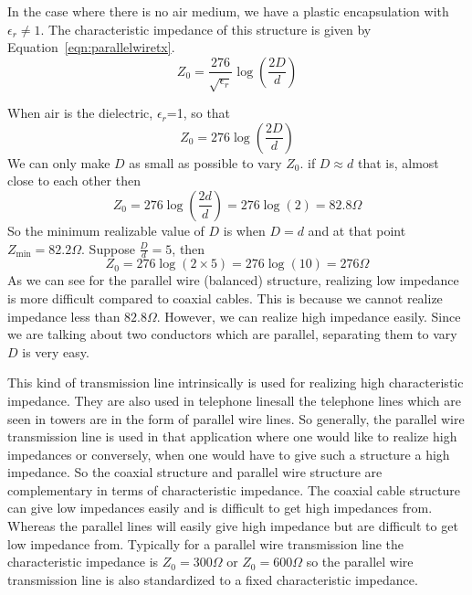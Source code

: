 In the case where there is no air medium, we have a plastic encapsulation with $\epsilon_r\neq1$. The characteristic impedance of this structure is given by Equation~\eqref{eqn:parallelwiretx}.
\begin{equation}
Z_0 =\dfrac{276}{\sqrt{\epsilon_r}}\log(\dfrac{2D}{d})
\label{eqn:parallelwiretx}
\end{equation}

When air is the dielectric, $\epsilon_r$=1, so that
\begin{equation}
Z_0 = 276\log(\dfrac{2D}{d})
\label{eqn:parallelwiretxair}
\end{equation}
We can only make $D$ as small as possible to vary $Z_0 $. if $D\approx d$ that is, almost close to each other then 
\begin{dmath*}
Z_0 = 276\log(\dfrac{2d}{d})
=276\log(2)
=82.8\varOmega
\end{dmath*}
So the minimum realizable value of $D$ is when $D = d$ and at that point $Z_\min=82.2\varOmega$. Suppose $\frac{D}{d}=5$, then
\begin{dmath*}
Z_0 =276\log(2\times5)
=276\log(10)
=276\varOmega
\end{dmath*}
As we can see for the parallel wire (balanced) structure, realizing low impedance is more difficult compared to coaxial cables. This is because we cannot realize impedance less than $82.8\varOmega$. However, we can realize high impedance easily. Since we are talking about two conductors which are parallel, separating them to vary $D$ is very easy.

This kind of transmission line intrinsically is used for realizing high characteristic impedance. They are also used in telephone lines\textemdash all the telephone lines which are seen in towers are in the form of parallel wire lines. So generally, the parallel wire transmission line is used in that application where one would like to realize high impedances or conversely, when one would have to give such a structure a high impedance. So the coaxial structure and parallel wire structure are complementary in terms of characteristic impedance. The coaxial cable structure can give low impedances easily and is difficult to get high impedances from. Whereas the parallel lines will easily give high impedance but are difficult to get low impedance from. Typically for a parallel wire transmission line the characteristic impedance is $Z_0 =300\varOmega$ or $Z_0 =600\varOmega$ so the parallel wire transmission line is also standardized to a fixed characteristic impedance.


